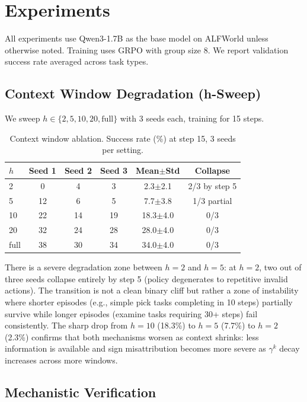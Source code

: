 \documentclass[11pt]{article}
\begin{document}
\section{Experiments}

All experiments use Qwen3-1.7B as the base model on ALFWorld unless otherwise noted. Training uses GRPO with group size 8. We report validation success rate averaged across task types.

\subsection{Context Window Degradation (h-Sweep)}

We sweep $h \in \{2, 5, 10, 20, \text{full}\}$ with 3 seeds each, training for 15 steps.

\begin{table}[h]
\centering
\caption{Context window ablation. Success rate (\%) at step 15, 3 seeds per setting.}
\label{tab:hsweep}
\begin{tabular}{lccccc}
\toprule
$h$ & Seed 1 & Seed 2 & Seed 3 & Mean$\pm$Std & Collapse \\
\midrule
2 & 0 & 4 & 3 & 2.3$\pm$2.1 & 2/3 by step 5 \\
5 & 12 & 6 & 5 & 7.7$\pm$3.8 & 1/3 partial \\
10 & 22 & 14 & 19 & 18.3$\pm$4.0 & 0/3 \\
20 & 32 & 24 & 28 & 28.0$\pm$4.0 & 0/3 \\
full & 38 & 30 & 34 & 34.0$\pm$4.0 & 0/3 \\
\bottomrule
\end{tabular}
\end{table}

There is a severe degradation zone between $h=2$ and $h=5$: at $h=2$, two out of three seeds collapse entirely by step 5 (policy degenerates to repetitive invalid actions). The transition is not a clean binary cliff but rather a zone of instability where shorter episodes (e.g., simple pick tasks completing in 10 steps) partially survive while longer episodes (examine tasks requiring 30+ steps) fail consistently. The sharp drop from $h=10$ (18.3\%) to $h=5$ (7.7\%) to $h=2$ (2.3\%) confirms that both mechanisms worsen as context shrinks: less information is available and sign misattribution becomes more severe as $\gamma^k$ decay increases across more windows.

\subsection{Mechanistic Verification}
\end{document}
